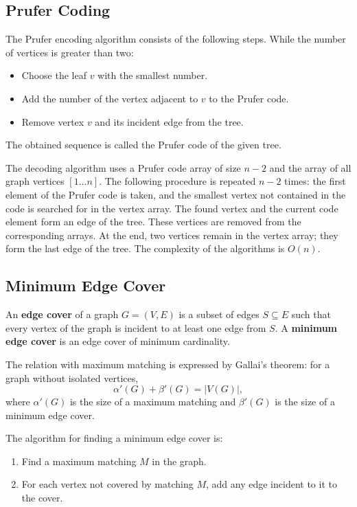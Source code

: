 \documentclass[a4paper,final]{article}
\begin{document}
	\subsection{Prufer Coding}

The Prufer encoding algorithm consists of the following steps. While the number of vertices is greater than two:
\begin{itemize}
  \item Choose the leaf $v$ with the smallest number.
  \item Add the number of the vertex adjacent to $v$ to the Prufer code.
  \item Remove vertex $v$ and its incident edge from the tree.
\end{itemize}

The obtained sequence is called the Prufer code of the given tree.

The decoding algorithm uses a Prufer code array of size $n-2$ and the array of all graph vertices $[1\ldots n]$. The following procedure is repeated $n-2$ times: the first element of the Prufer code is taken, and the smallest vertex not contained in the code is searched for in the vertex array. The found vertex and the current code element form an edge of the tree. These vertices are removed from the corresponding arrays. At the end, two vertices remain in the vertex array; they form the last edge of the tree. The complexity of the algorithms is $O(n)$.

	\subsection{Minimum Edge Cover}

An \textbf{edge cover} of a graph $G = (V, E)$ is a subset of edges $S \subseteq E$ such that every vertex of the graph is incident to at least one edge from $S$. A \textbf{minimum edge cover} is an edge cover of minimum cardinality.

The relation with maximum matching is expressed by Gallai's theorem: for a graph without isolated vertices,
\[
\alpha'(G) + \beta'(G) = |V(G)|,
\]
where $\alpha'(G)$ is the size of a maximum matching and $\beta'(G)$ is the size of a minimum edge cover.

The algorithm for finding a minimum edge cover is:
\begin{enumerate}
  \item Find a maximum matching $M$ in the graph.
  \item For each vertex not covered by matching $M$, add any edge incident to it to the cover.
\end{enumerate}
\end{document}
